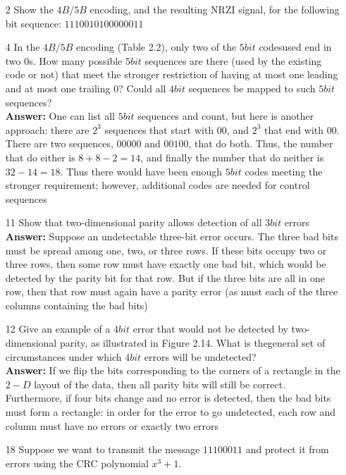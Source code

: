 \documentclass[a4paper]{article}
\begin{document}
\begin{itemize}
	\item[2] Show the $4B/5B$ encoding, and the resulting NRZI signal, for the following bit sequence: $1110 0101 0000 0011$
	\item[4] In the $4B/5B$ encoding (Table 2.2), only two of the $5 bit$ codesused end in two 0s. How many possible $5 bit$ sequences are there (used by the existing code or not) that meet the stronger restriction of having at most one leading and at most one trailing 0? Could all $4 bit$ sequences be mapped to such $5 bit$ sequences? \\
	      \textbf{Answer:} One can list all $5 bit$ sequences and count, but here is another approach: there are $2^3$ sequences that start with $00$, and $2^3$ that end with $00$. There are two sequences, $00000$ and $00100$, that do both. Thus, the number that do either is $8 + 8 - 2 = 14$, and finally the number that do neither is $32 - 14 = 18$. Thus there would have been enough $5 bit$ codes meeting the stronger requirement; however, additional codes are needed for control sequences 
	\item[11] Show that two-dimensional parity allows detection of all $3 bit$ errors \\
	      \textbf{Answer:} Suppose an undetectable three-bit error occurs. The three bad bits must be spread among one, two, or three rows. If these bits occupy two or three rows, then some row must have exactly one bad bit, which would be detected by the parity bit for that row. But if the three bits are all in one row, then that row must again have a parity error (as must each of the three columns containing the bad bits) 
	\item[12] Give an example of a $4 bit$ error that would not be detected by two-dimensional parity, as illustrated in Figure 2.14. What is thegeneral set of circumstances under which $4 bit$ errors will be undetected? \\
	      \textbf{Answer:} If we flip the bits corresponding to the corners of a rectangle in the $2-D$ layout of the data, then all parity bits will still be correct. Furthermore, if four bits change and no error is detected, then the bad bits must form a rectangle: in order for the error to go undetected, each row and column must have no errors or exactly two errors 
	\item[18] Suppose we want to transmit the message $1110 0011$ and protect it from errors using the CRC polynomial $x^3+ 1$.
	      \begin{itemize}

\end{itemize}
\end{itemize}
\end{document}

